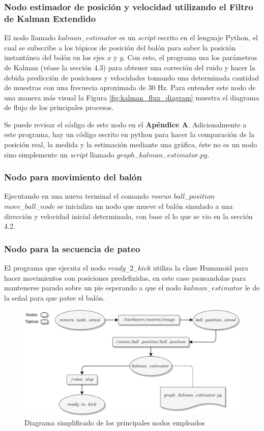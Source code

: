 			\subsubsection*{Nodo estimador de posición y velocidad utilizando el Filtro de Kalman Extendido}
			El nodo llamado $kalman_-estimator$ es un \textit{script} escrito en el lenguaje Python, el cual se subscribe a los tópicos de posición del balón para saber la posición instantánea del balón en los ejes $x$ y $y$. Con esto, el programa usa los parámetros de Kalman (véase la sección 4.3) para obtener una correción del ruido y hacer la debida predicción de posiciones y velocidades tomando una determinada cantidad de muestras con una frecuecia aproximada de 30 Hz. Para entender este nodo de una manera más visual la Figura \ref{fig:kalman_flux_diagram} muestra el diagrama de flujo de los principales procesos. 
			
			Se puede revisar el código de este nodo en el \textbf{Apéndice A}.
	Adicionalmente a este programa, hay un código escrito en python para hacer la comparación de la posición real, la medida y la estimación mediante una gráfica, éste no es un nodo sino simplemente un \textit{script} llamado $graph_-kalman_-estimator.py$.
			
			\subsubsection*{Nodo para movimiento del balón}
			Ejecutando en una nueva terminal el comando \textit{rosrun $ball_-position$ $move_-ball_-node$} se inicializa un nodo que mueve el balón simulado a una dirección y velocidad inicial determinada, con base el lo que se vio en la sección 4.2. 
			
			\subsubsection*{Nodo para la secuencia de pateo} 
			El programa que ejecuta el nodo \textit{$ready_-2_-kick$} utiliza la clase Humanoid para hacer movimientos con posiciones predefinidas, en este caso pausandolas para mantenerse parado sobre un pie esperando a que el nodo $kalman_-estimator$ le de la señal para que patee el balón.
		
		
\begin{figure}
	\centering
	\includegraphics[scale=0.071]{images/nodes_diagram.png}
	\caption{Diagrama simplificado de los principales nodos empleados}
	\label{fig:nodes_diagram}
\end{figure}
		

